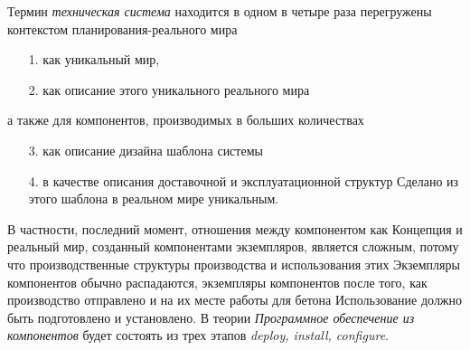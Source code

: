 \documentclass[11pt,a4paper]{article}
\begin{document}
Термин \emph{техническая система} находится в одном в четыре раза перегружены
контекстом планирования-реального мира
\begin{itemize}
\item [1.] как уникальный мир,
\item [2.] как описание этого уникального реального мира
\end{itemize}
а также для компонентов, производимых в больших количествах
\begin{itemize}
\item [3.] как описание дизайна шаблона системы
\item [4.] в качестве описания доставочной и эксплуатационной структур Сделано
  из этого шаблона в реальном мире уникальным.
\end{itemize}

В частности, последний момент, отношения между компонентом как Концепция и
реальный мир, созданный компонентами экземпляров, является сложным, потому что
производственные структуры производства и использования этих Экземпляры
компонентов обычно распадаются, экземпляры компонентов после того, как
производство отправлено и на их месте работы для бетона Использование должно
быть подготовлено и установлено. В теории \emph{Программное обеспечение из
  компонентов} будет состоять из трех этапов \emph{deploy, install,
  configure}. 
\end{document}
